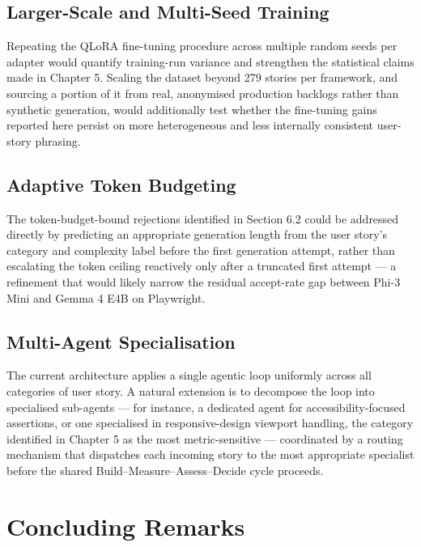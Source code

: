 \subsection{Larger-Scale and Multi-Seed Training}

Repeating the QLoRA fine-tuning procedure across multiple random seeds
per adapter would quantify training-run variance and strengthen the
statistical claims made in Chapter 5. Scaling the dataset beyond 279
stories per framework, and sourcing a portion of it from real,
anonymised production backlogs rather than synthetic generation, would
additionally test whether the fine-tuning gains reported here persist on
more heterogeneous and less internally consistent user-story phrasing.

\subsection{Adaptive Token Budgeting}

The token-budget-bound rejections identified in Section 6.2 could be
addressed directly by predicting an appropriate generation length from
the user story's category and complexity label before the first
generation attempt, rather than escalating the token ceiling reactively
only after a truncated first attempt --- a refinement that would likely
narrow the residual accept-rate gap between Phi-3 Mini and Gemma 4 E4B
on Playwright.

\subsection{Multi-Agent Specialisation}

The current architecture applies a single agentic loop uniformly across
all categories of user story. A natural extension is to decompose the
loop into specialised sub-agents --- for instance, a dedicated agent for
accessibility-focused assertions, or one specialised in
responsive-design viewport handling, the category identified in Chapter
5 as the most metric-sensitive --- coordinated by a routing mechanism
that dispatches each incoming story to the most appropriate specialist
before the shared Build--Measure--Assess--Decide cycle proceeds.

\section{Concluding Remarks}

